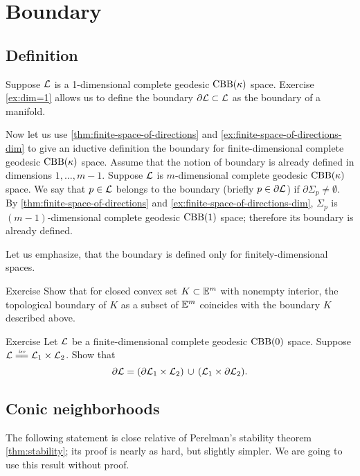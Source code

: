 \chapter{Boundary}

\section{Definition}

Suppose $\mathcal{L}$ is a 1-dimensional complete geodesic $\mathrm{CBB}(\kappa)$ space.
Exercise \ref{ex:dim=1} allows us to define the boundary $\partial\mathcal{L}\subset \mathcal{L}$ as the boundary of a manifold.

Now let us use \ref{thm:finite-space-of-directions} and \ref{ex:finite-space-of-directions-dim} to give an iductive definition the boundary for finite-dimensional complete geodesic $\mathrm{CBB}(\kappa)$ space.
Assume that the notion of boundary is already defined in dimensions $1,\dots,m-1$.
Suppose  $\mathcal{L}$ is $m$-dimensional complete geodesic $\mathrm{CBB}(\kappa)$ space.
We say that $p\in \mathcal{L}$ belongs to the boundary (briefly $p\in \partial \mathcal{L}$) if 
$\partial\Sigma_p\ne\emptyset$.
By \ref{thm:finite-space-of-directions} and \ref{ex:finite-space-of-directions-dim}, $\Sigma_p$ is $(m-1)$-dimensional complete geodesic $\mathrm{CBB}(1)$ space;
therefore its boundary is already defined.

Let us emphasize, that the boundary is defined only for finitely-dimensional spaces.

\begin{thm}{Exercise}
Show that for closed convex set $K\subset \mathbb{E}^m$ with nonempty interior, the topological boundary of $K$ as a subset of $\mathbb{E}^m$ coincides with the boundary $K$ described above.
\end{thm}

\begin{thm}{Exercise}
Let $\mathcal{L}$ be a finite-dimensional complete geodesic $\mathrm{CBB}(0)$ space.
Suppose $\spc{L}\iso\spc{L}_1\times\spc{L}_2$.
Show that 
\[\partial \mathcal{L}=(\partial\mathcal{L}_1\times\mathcal{L}_2)\,\cup\,(\mathcal{L}_1\times\partial\mathcal{L}_2).\]
\end{thm}


\section{Conic neighborhoods}


The following statement is close relative of Perelman's stability theorem \ref{thm:stability};
its proof is nearly as hard, but slightly simpler.
We are going to use this result without proof.



